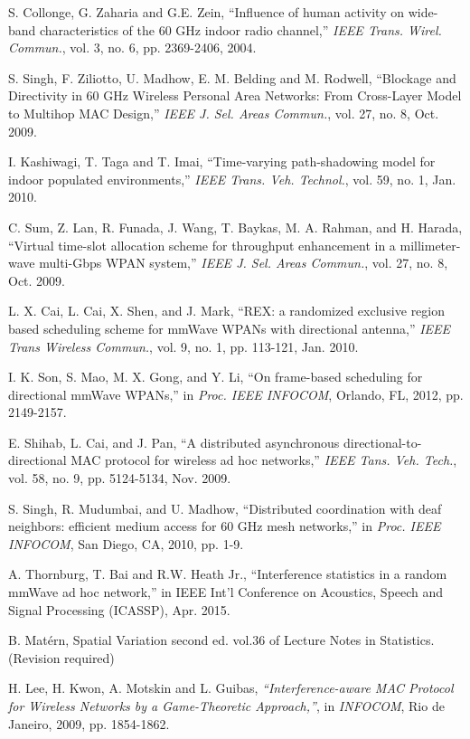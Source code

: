\documentclass[10pt, conference, letterpaper]{IEEEtran}
\begin{document}
\begin{thebibliography}{50}
S. Collonge, G. Zaharia and G.E. Zein, ``Influence of human activity on wide-band characteristics of the 60 GHz indoor radio channel,'' \emph{IEEE Trans. Wirel. Commun.}, vol. 3,  no. 6, pp. 2369-2406, 2004.

S. Singh, F. Ziliotto, U. Madhow, E. M. Belding and M. Rodwell, ``Blockage and Directivity in 60 GHz Wireless Personal Area Networks: From Cross-Layer Model to Multihop MAC Design,'' \emph{IEEE J. Sel. Areas Commun.}, vol. 27, no. 8, Oct. 2009.

I. Kashiwagi, T. Taga and T. Imai, ``Time-varying path-shadowing model for indoor populated environments,'' \emph{IEEE Trans. Veh. Technol.}, vol. 59, no. 1, Jan. 2010.

C. Sum, Z. Lan, R. Funada, J. Wang, T. Baykas, M. A. Rahman, and H. Harada, ``Virtual time-slot allocation scheme for throughput enhancement in a millimeter-wave multi-Gbps WPAN system,'' \emph{IEEE J. Sel. Areas Commun.}, vol. 27, no. 8, Oct. 2009.

L. X. Cai, L. Cai, X. Shen, and J. Mark, ``REX: a randomized exclusive region based scheduling scheme for mmWave WPANs with directional antenna,'' \emph{IEEE Trans Wireless Commun.}, vol. 9, no. 1, pp. 113-121, Jan. 2010. 

I. K. Son, S. Mao, M. X. Gong, and Y. Li, ``On frame-based scheduling for directional mmWave WPANs,'' in \emph{Proc. IEEE INFOCOM}, Orlando, FL, 2012, pp. 2149-2157.

E. Shihab, L. Cai, and J. Pan, ``A distributed asynchronous directional-to-directional MAC protocol for wireless ad hoc networks,'' \emph{IEEE Tans. Veh. Tech.}, vol. 58, no. 9, pp. 5124-5134, Nov. 2009. 

S. Singh, R. Mudumbai, and U. Madhow, ``Distributed coordination with deaf neighbors: efficient medium access for 60 GHz mesh networks,'' in \emph{Proc. IEEE INFOCOM}, San Diego, CA, 2010, pp. 1-9.

A. Thornburg, T. Bai and R.W. Heath Jr., ``Interference statistics in a random mmWave ad hoc network,'' in IEEE Int'l Conference on Acoustics, Speech and Signal Processing (ICASSP), Apr. 2015.

B. Mat\'ern, Spatial Variation second ed. vol.36 of Lecture Notes in Statistics. (Revision required)

H. Lee, H. Kwon, A. Motskin and  L. Guibas, \emph{``Interference-aware MAC Protocol for Wireless Networks by a Game-Theoretic Approach,''}, in \emph{INFOCOM}, Rio de Janeiro, 2009, pp. 1854-1862.


\end{thebibliography}
\end{document}
